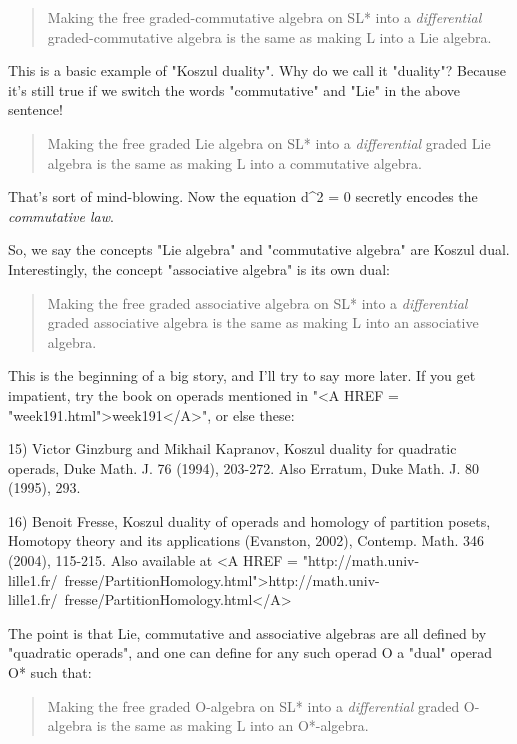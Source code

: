 \begin{quote}
 Making the free graded-commutative algebra on SL* into a \emph{differential}
 graded-commutative algebra is the same as making L into a Lie algebra.  
\end{quote}

This is a basic example of "Koszul duality".  Why do we call it 
"duality"?  Because it's still true if we switch the words 
"commutative" and "Lie" in the above sentence!

\begin{quote}
 Making the free graded Lie algebra on SL* into a \emph{differential}
 graded Lie algebra is the same as making L into a commutative algebra.
\end{quote}

That's sort of mind-blowing.  Now the equation d^{2} = 0 secretly 
encodes the \emph{commutative law}.

So, we say the concepts "Lie algebra" 
and "commutative algebra" are
Koszul dual.  Interestingly, the concept "associative 
algebra" is its own dual:

\begin{quote}
 Making the free graded associative algebra on SL* into a \emph{differential}
 graded associative algebra is the same as making L into an associative
 algebra.
\end{quote}

This is the beginning of a big story, and I'll try to say more later.
If you get impatient, try the book on operads mentioned in "<A HREF = "week191.html">week191</A>",
or else these:

15) Victor Ginzburg and Mikhail Kapranov, Koszul duality for quadratic
operads, Duke Math. J. 76 (1994), 203-272.  Also Erratum, Duke Math. 
J. 80 (1995), 293.

16) Benoit Fresse, Koszul duality of operads and homology of partition 
posets, Homotopy theory and its applications (Evanston, 2002), 
Contemp. Math. 346 (2004), 115-215.  Also available at 
<A HREF = "http://math.univ-lille1.fr/~fresse/PartitionHomology.html">http://math.univ-lille1.fr/~fresse/PartitionHomology.html</A>

The point is that Lie, commutative and associative algebras are all
defined by "quadratic operads", and one can define for any such 
operad O a "dual" operad O* such that:

\begin{quote}
 Making the free graded O-algebra on SL* into a \emph{differential}
 graded O-algebra is the same as making L into an O*-algebra.
\end{quote}

